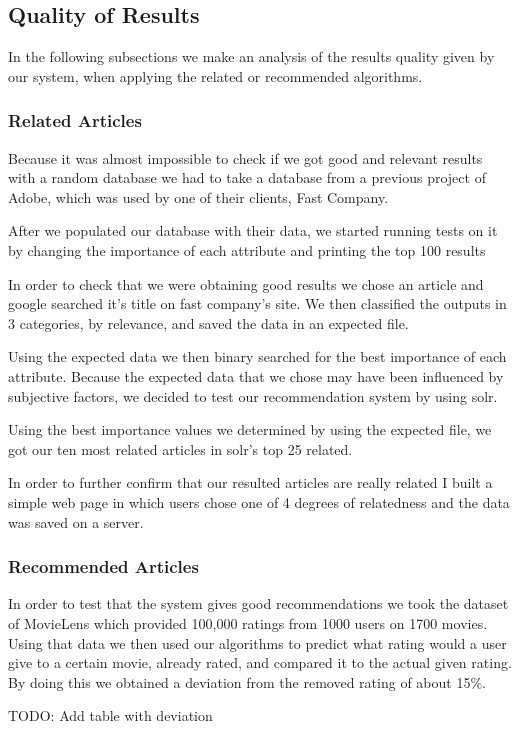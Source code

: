 \subsection{Quality of Results}
\label{sec:quality-of-results}
In the following subsections we make an analysis of the results quality given by our system, when applying the related or recommended algorithms.

\subsubsection{Related Articles}
\label{sec:related-articles}
Because it was almost impossible to check if we got good and relevant results with a random database we had to take a database from a previous project of Adobe, which was used by one of their clients, Fast Company. 

After we populated our database with their data, we started running tests on it by changing the importance of each attribute and printing the top 100 results

In order to check that we were obtaining  good results we chose an article and google searched it's title on fast company’s site. We then classified the outputs in 3 categories, by relevance, and saved the data in an expected file.

Using the expected data we then binary searched for the best importance of each attribute.
Because the expected data that we chose may have been influenced by subjective factors, we decided to test our recommendation system by using solr.

Using the best importance values we determined by using the expected file, we got our ten most related articles in solr's top 25 related.

In order to further confirm that our resulted articles are really related I built a simple web page in which users chose one of 4 degrees of relatedness and the data was saved on a server.

\subsubsection{Recommended Articles}
\label{sec:recommended-articles}
In order to test that the system gives good recommendations we took the dataset of MovieLens which provided 100,000 ratings from 1000 users on 1700 movies. Using that data we then used our algorithms to predict what rating would a user give to a certain movie, already rated, and compared it to the actual given rating. By doing this we obtained a deviation from the removed rating of about 15\%.

TODO: Add table with deviation